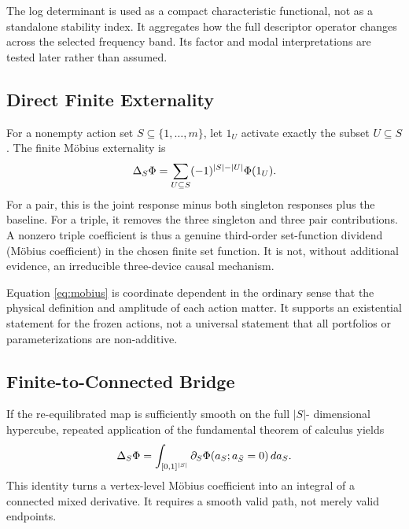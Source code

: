 The log determinant is used as a compact characteristic functional, not as a
standalone stability index. It aggregates how the full descriptor operator
changes across the selected frequency band. Its factor and modal
interpretations are tested later rather than assumed.

\subsection{Direct Finite Externality}

For a nonempty action set $S\subseteq\{1,\ldots,m\}$, let $1_U$ activate
exactly the subset $U\subseteq S$. The finite M\"obius externality is
\begin{equation}
\Delta_{S}\Phi=\sum_{U\subseteq S}(-1)^{|S|-|U|}\Phi(1_U).
\label{eq:mobius}
\end{equation}
For a pair, this is the joint response minus both singleton responses plus the
baseline. For a triple, it removes the three singleton and three pair
contributions. A nonzero triple coefficient is thus a genuine third-order
set-function dividend (M\"obius coefficient) in the chosen finite set
function. It is not, without additional
evidence, an irreducible three-device causal mechanism.

Equation \eqref{eq:mobius} is coordinate dependent in the ordinary sense that
the physical definition and amplitude of each action matter. It supports an
existential statement for the frozen actions, not a universal statement that
all portfolios or parameterizations are non-additive.

\subsection{Finite-to-Connected Bridge}

If the re-equilibrated map is sufficiently smooth on the full $|S|$-
dimensional hypercube, repeated application of the fundamental theorem of
calculus yields
\begin{equation}
\Delta_{S}\Phi
=\int_{[0,1]^{|S|}}\partial_S\Phi(a_S;a_{\bar S}=0)\, da_S .
\label{eq:bridge}
\end{equation}
This identity turns a vertex-level M\"obius coefficient into an integral of
a connected mixed derivative. It requires a smooth valid path, not merely
valid endpoints.

